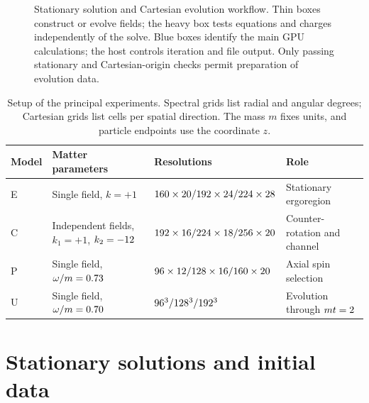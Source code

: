 \documentclass[10pt,twocolumn,floatfix,aps,prd,superscriptaddress,nofootinbib]{revtex4-2}
\begin{document}
\begin{figure}[t]
\caption{Stationary solution and Cartesian evolution workflow. Thin boxes
construct or evolve fields; the heavy box tests equations and charges
independently of the solve. Blue boxes identify the main GPU calculations;
the host controls iteration and file output. Only passing stationary and
Cartesian-origin checks permit preparation of evolution data.}
\label{fig:solver}
\end{figure}

\begin{table}[t]
\caption{Setup of the principal experiments. Spectral grids list radial
and angular degrees; Cartesian grids list cells per spatial direction.
The mass $m$ fixes units, and particle endpoints use the coordinate $z$.}
\label{tab:setup}
\begin{ruledtabular}
\begin{tabular}{llll}
Model & Matter parameters & Resolutions & Role\\
\hline
E & Single field, $k=+1$ & $160\times20/192\times24/224\times28$ & Stationary ergoregion\\
C & Independent fields, $k_1=+1$, $k_2=-12$ &
 $192\times16/224\times18/256\times20$ & Counter-rotation and channel\\
P & Single field, $\omega/m=0.73$ &
 $96\times12/128\times16/160\times20$ & Axial spin selection\\
U & Single field, $\omega/m=0.70$ &
 $96^3/128^3/192^3$ & Evolution through $mt=2$\\
\end{tabular}
\end{ruledtabular}
\end{table}

\section{Stationary solutions and initial data}
\label{sec:initial}
\end{document}
